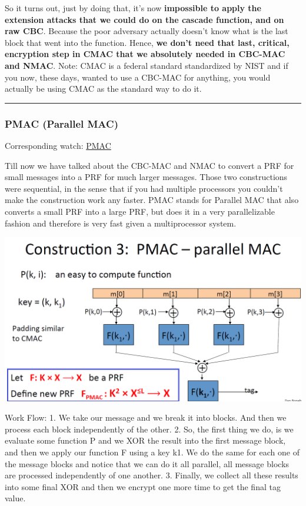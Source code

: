 \documentclass[11pt]{article}
\makeatletter
\def\maxwidth{\ifdim\Gin@nat@width>\linewidth\linewidth
    \else\Gin@nat@width\fi}
\let\Oldincludegraphics\includegraphics
\renewcommand{\includegraphics}[1]{\Oldincludegraphics[width=.8\maxwidth]{#1}}
\makeatother
\begin{document}
So it turns out, just by doing that, it's now \textbf{impossible to
apply the extension attacks that we could do on the cascade function,
and on raw CBC}. Because the poor adversary actually doesn't know what
is the last block that went into the function. Hence, \textbf{we don't
need that last, critical, encryption step in CMAC that we absolutely
needed in CBC-MAC and NMAC}. Note: CMAC is a federal standard
standardized by NIST and if you now, these days, wanted to use a CBC-MAC
for anything, you would actually be using CMAC as the standard way to do
it.

\begin{center}\rule{0.5\linewidth}{\linethickness}\end{center}

    \hypertarget{pmac-parallel-mac}{%
\subsubsection{PMAC (Parallel MAC)}\label{pmac-parallel-mac}}

Corresponding watch:
\href{https://www.coursera.org/learn/crypto/lecture/u8xyE/pmac-and-the-carter-wegman-mac}{PMAC}

Till now we have talked about the CBC-MAC and NMAC to convert a PRF for
small messages into a PRF for much larger messages. Those two
constructions were sequential, in the sense that if you had multiple
processors you couldn't make the construction work any faster. PMAC
stands for Parallel MAC that also converts a small PRF into a large PRF,
but does it in a very parallelizable fashion and therefore is very fast
given a multiprocessor system.

\includegraphics{./Images/PMAC.png}

Work Flow: 1. We take our message and we break it into blocks. And then
we process each block independently of the other. 2. So, the first thing
we do, is we evaluate some function P and we XOR the result into the
first message block, and then we apply our function F using a key k1. We
do the same for each one of the message blocks and notice that we can do
it all parallel, all message blocks are processed independently of one
another. 3. Finally, we collect all these results into some final XOR
and then we encrypt one more time to get the final tag value.
\end{document}
